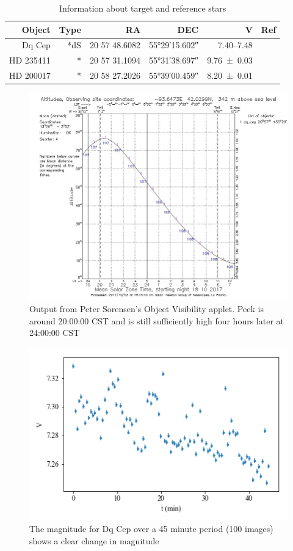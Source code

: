 \documentclass[]{article}
\begin{document}
\begin{table}[h]
	\centering
	\caption{Information about target and reference stars}
	\begin{tabular}{rrrrrr}
		\hline
		Object & Type &            RA &                DEC &                      V &                        Ref \\ \hline\hline
		Dq Cep &  *dS & 20 57 48.6082 & \ang{55;29;15.602} & \SIrange{7.40}{7.48}{} & \cite{1971GCVS3.C......0K} \\
		HD 235411 &    * & 20 57 31.1094 & \ang{55;31;38.697} &     \SI{9.76\pm0.03}{} &  \cite{2000AA...355L..27H} \\
		HD 200017 &    * & 20 58 27.2026 & \ang{55;39;00.459} &     \SI{8.20\pm0.01}{} &  \cite{2000AA...355L..27H} \\ \hline
	\end{tabular}
	\label{tab:info}
\end{table}


\begin{figure}[h]
	\includegraphics[width=\linewidth]{figs/staralt.png}
	\caption{Output from Peter Sorensen's Object Visibility applet. Peek is around 20:00:00 CST and is still sufficiently high four hours later at 24:00:00 CST}
	\label{fig:staralt}
\end{figure}

\begin{figure}[h]
	\includegraphics[width=\linewidth]{figs/mags.png}
	\caption{The magnitude for Dq Cep over a 45 minute period (100 images) shows a clear change in magnitude}
	\label{fig:mags}
\end{figure}
\end{document}
